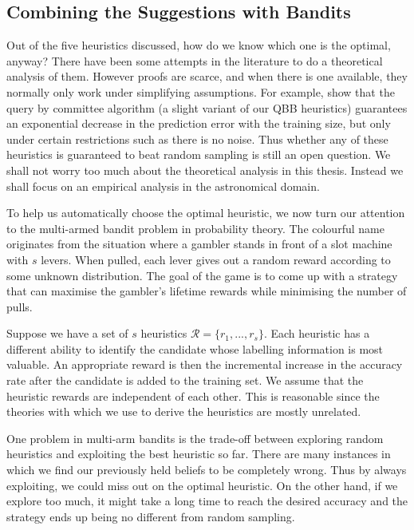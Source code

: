 \documentclass[fleqn,10pt,lineno]{wlpeerj} %
\newcommand{\R}{\mathcal{R}}
\begin{document}
\subsection*{Combining the Suggestions with Bandits}

Out of the five heuristics discussed, how do we know which one is the optimal, anyway? There have
been some attempts in the literature to do a theoretical analysis of them. However proofs are
scarce, and when there is one available, they normally only work under simplifying assumptions. For
example, \cite{freund97} show that the query by committee algorithm (a slight variant of our
QBB heuristics) guarantees an exponential decrease in the prediction error with the training size,
but only under certain restrictions such as there is no noise. Thus whether any of these heuristics
is guaranteed to beat random sampling is still an open question. We shall not worry too much about
the theoretical analysis in this thesis. Instead we shall focus on an empirical analysis in the
astronomical domain.

To help us automatically choose the optimal heuristic, we now turn our attention to the multi-armed
bandit problem in probability theory. The colourful name originates from the situation where a
gambler stands in front of a slot machine with $s$ levers. When pulled, each lever gives out a random
reward according to some unknown distribution. The goal of the game is to come up with a strategy
that can maximise the gambler's lifetime rewards while minimising the number of pulls.

Suppose we have a set of $s$ heuristics $ \R = \{r_1, ..., r_s \}$. Each heuristic has a different
ability to identify the candidate whose labelling information is most valuable. An appropriate
reward is then the incremental increase in the accuracy rate after the candidate is added to the
training set. We assume that the heuristic rewards are independent of each other. This is
reasonable since the theories with which we use to derive the heuristics are mostly unrelated.

One problem in multi-arm bandits is the trade-off between exploring random heuristics and exploiting the best heuristic so far.
There are many instances in which we find our previously held beliefs to
be completely wrong. Thus by always exploiting, we could miss out on the optimal heuristic. On the
other hand, if we explore too much, it might take a long time to reach the desired accuracy and the
strategy ends up being no different from random sampling.
\end{document}
